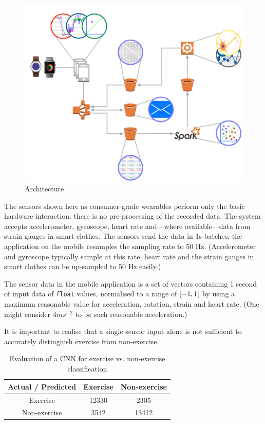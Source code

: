 \documentclass[a4paper, 10 pt, conference]{IEEEtran}
\begin{document}
\begin{figure}[hb]
	\begin{center}
		\includegraphics[scale=0.2]{ri-arch.png}
		\caption{Architecture}
		\label{default}
	\end{center}
\end{figure}

The sensors shown here as consumer-grade wearables perform only the basic hardware interaction: there is no pre-processing of the recorded data. The system accepts accelerometer, gyroscope, heart rate and---where available---data from strain gauges in smart clothes. The sensors send the data in 1s batches; the application on the mobile resamples the sampling rate to 50 Hz. (Accelerometer and gyroscope typically sample at this rate, heart rate and the strain gauges in smart clothes can be up-sampled to 50 Hz easily.) 

The sensor data in the mobile application is a set of vectors containing 1 second of input data of \texttt{float} values, normalised to a range of $\interval[open]{-1}{1}$ by using a maximum reasonable value for acceleration, rotation, strain and heart rate. (One might consider $4 ms^{-2}$ to be such reasonable acceleration.)

It is important to realise that a single sensor input alone is not sufficient to accurately distinguish exercise from non-exercise. 

\begin{table}[h]
\caption{Evaluation of a CNN for exercise vs. non-exercise classification}
\label{exercise}
\begin{center}
\begin{tabular}{|c||c||c|}
\hline
Actual / Predicted & Exercise & Non-exercise\\
\hline
Exercise & 12330 & 2305\\
\hline
Non-exercise & 3542 & 13412\\
\hline
\end{tabular}
\end{center}
\end{table}
\end{document}
